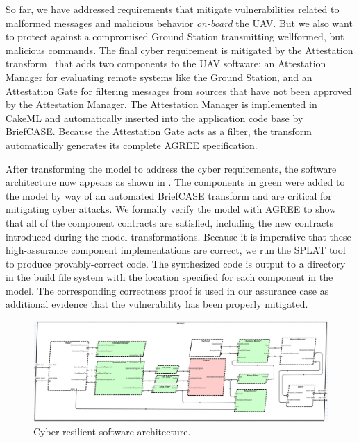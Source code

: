 So far, we have addressed requirements that 
mitigate vulnerabilities related to malformed messages and malicious behavior \textit{on-board} the UAV.  But we also want to protect against a compromised Ground Station transmitting wellformed, but malicious commands. The final cyber requirement is mitigated by the Attestation transform~\cite{attestation-copland} that adds two components to the UAV software: an Attestation Manager for evaluating remote systems like the Ground Station, and an Attestation Gate for filtering messages from sources that have not been approved by the Attestation Manager.  The Attestation Manager is implemented in CakeML and automatically inserted into the application code base by BriefCASE.  Because the Attestation Gate acts as a filter, the transform automatically generates its complete AGREE specification.%


After transforming the model to address the cyber requirements, the software architecture now appears as shown in .  The components in green were added to the model by way of an automated BriefCASE transform and are critical for mitigating cyber attacks. 
We formally verify the model with AGREE to show that all of the component contracts are satisfied, including the new contracts introduced during the model transformations.
Because it is imperative that these high-assurance component implementations are correct,
we run the SPLAT tool to produce provably-correct code.  
The synthesized code is output to a directory in the build file system with the location specified for each component in the model.  The corresponding correctness proof is used in our assurance case as additional evidence that the vulnerability has been properly mitigated.

\begin{figure}[h]
	\centering
	\includegraphics[width=1\columnwidth]{figs/hardened-sw.png}
	\caption{Cyber-resilient software architecture.} 
	\label{fig:hardened-sw} 
\end{figure}

